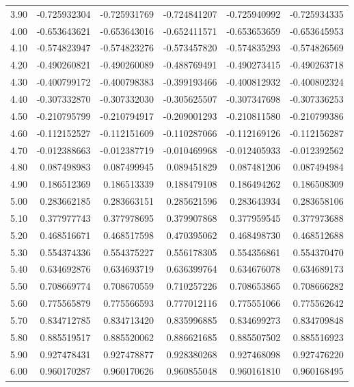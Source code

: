 \documentclass[11pt,a4paper]{article}
\begin{document}
\begin{longtable}{rrrrrr}
3.90 & -0.725932304 & -0.725931769 & -0.724841207 & -0.725940992 & -0.725934335 \\
4.00 & -0.653643621 & -0.653643016 & -0.652411571 & -0.653653659 & -0.653645953 \\
4.10 & -0.574823947 & -0.574823276 & -0.573457820 & -0.574835293 & -0.574826569 \\
4.20 & -0.490260821 & -0.490260089 & -0.488769491 & -0.490273415 & -0.490263718 \\
4.30 & -0.400799172 & -0.400798383 & -0.399193466 & -0.400812932 & -0.400802324 \\
4.40 & -0.307332870 & -0.307332030 & -0.305625507 & -0.307347698 & -0.307336253 \\
4.50 & -0.210795799 & -0.210794917 & -0.209001293 & -0.210811580 & -0.210799386 \\
4.60 & -0.112152527 & -0.112151609 & -0.110287066 & -0.112169126 & -0.112156287 \\
4.70 & -0.012388663 & -0.012387719 & -0.010469968 & -0.012405933 & -0.012392562 \\
4.80 & 0.087498983 & 0.087499945 & 0.089451829 & 0.087481206 & 0.087494984 \\
4.90 & 0.186512369 & 0.186513339 & 0.188479108 & 0.186494262 & 0.186508309 \\
5.00 & 0.283662185 & 0.283663151 & 0.285621596 & 0.283643934 & 0.283658106 \\
5.10 & 0.377977743 & 0.377978695 & 0.379907868 & 0.377959545 & 0.377973688 \\
5.20 & 0.468516671 & 0.468517598 & 0.470395062 & 0.468498730 & 0.468512688 \\
5.30 & 0.554374336 & 0.554375227 & 0.556178305 & 0.554356861 & 0.554370470 \\
5.40 & 0.634692876 & 0.634693719 & 0.636399764 & 0.634676078 & 0.634689173 \\
5.50 & 0.708669774 & 0.708670559 & 0.710257226 & 0.708653865 & 0.708666282 \\
5.60 & 0.775565879 & 0.775566593 & 0.777012116 & 0.775551066 & 0.775562642 \\
5.70 & 0.834712785 & 0.834713420 & 0.835996885 & 0.834699273 & 0.834709848 \\
5.80 & 0.885519517 & 0.885520062 & 0.886621685 & 0.885507502 & 0.885516923 \\
5.90 & 0.927478431 & 0.927478877 & 0.928380268 & 0.927468098 & 0.927476220 \\
6.00 & 0.960170287 & 0.960170626 & 0.960855048 & 0.960161810 & 0.960168495 \\

\end{longtable}
\end{document}

